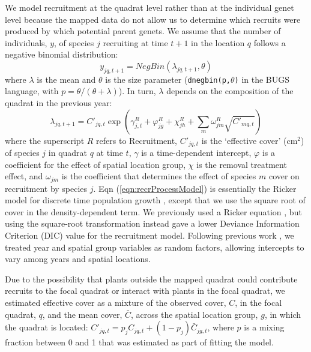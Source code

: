 \documentclass[11pt]{article}
\begin{document}
\begin{doublespacing}
We model recruitment at the quadrat level rather than at the individual genet level because the mapped data do not allow 
us to determine which recruits were produced by which potential parent genets. We assume that the number of individuals, $y$, of species $j$ recruiting at 
time $t+1$ in the location $q$ follows a negative binomial distribution:
\begin{equation}
y_{jq,t+1}= NegBin(\lambda_{jq,t+1},\theta) 	   
\label{eqn:recrDataModel}
\end{equation}
where $\lambda$ is the mean and $\theta$ is the size parameter (\texttt{dnegbin(p,$\theta$)} in the BUGS language, with $p=\theta/(\theta+\lambda)$). 
In turn, $\lambda$ depends on the composition of the quadrat in the previous year:
\begin{equation}
\lambda_{jq,t+1} = C'_{jq,t} \exp{\left(\gamma_{j,t}^R +  \varphi_{jg}^R + \chi_{jh}^R + 
\sum \limits_{m} \omega_{jm}^R \sqrt{C'_{mq,t}} \right)}
\label{eqn:recrProcessModel}
\end{equation}
where the superscript $R$ refers to Recruitment, $C'_{jq,t}$ is the `effective cover' (cm$^2$) of species $j$ in quadrat $q$ at time $t$, $\gamma$ 
is a time-dependent intercept, $\varphi$ is a coefficient for the effect of spatial location group,
$\chi$ is the removal treatment effect, and $\omega_{jm}$ is the coefficient that determines the effect of species $m$ cover on recruitment by species $j$. 
Eqn (\ref{eqn:recrProcessModel}) is essentially the Ricker model for discrete time population growth \citep{ricker_stock_1954}, except that we use the square root of cover in the density-dependent term. We previously used a Ricker equation \citep{adler_coexistence_2010}, but using the square-root transformation instead gave a lower Deviance Information Criterion (DIC) value \citep{spiegelhalter_bayesian_2002} for the recruitment model. Following previous work \citep{adler_coexistence_2010}, we treated year and spatial group variables as random factors, allowing intercepts to vary among years and spatial locations. 

Due to the possibility that plants outside the mapped quadrat could contribute recruits to the focal quadrat or interact with plants in the focal quadrat, we estimated effective cover as a mixture of the observed cover, $C$, in the focal quadrat, $q$, and the mean cover, $\bar{C}$, across the spatial location group, $g$, in which the 
quadrat is located: $C'_{jq,t}=p_j C_{jq,t}+(1-p_j) \bar{C}_{jg,t}$, where $p$ is a mixing fraction between 0 and 1 that was estimated as part of fitting the model.


\end{doublespacing}
\end{document}
